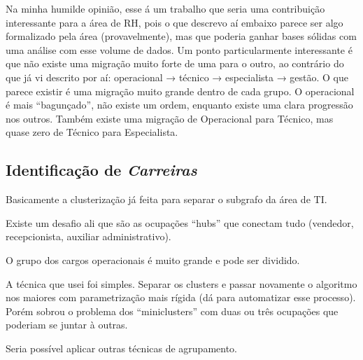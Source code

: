 \documentclass[12pt,a4paper]{article}
\theoremstyle{hypo}
\begin{document}
Na minha humilde opinião, esse á um trabalho que seria uma contribuição interessante para a área de RH, pois o que descrevo aí embaixo parece ser algo formalizado pela área (provavelmente), mas que poderia ganhar bases sólidas com uma análise com esse volume de dados. Um ponto particularmente interessante é que não existe uma migração muito forte de uma para o outro, ao contrário do que já vi descrito por aí: operacional → técnico → especialista → gestão. O que parece existir é uma migração muito grande dentro de cada grupo. O operacional é mais \enquote{bagunçado}, não existe um ordem, enquanto existe uma clara progressão nos outros. Também existe uma migração de Operacional para Técnico, mas quase zero de Técnico para Especialista.

\subsection{Identificação de \textit{Carreiras}}

Basicamente a clusterização já feita para separar o subgrafo da área de TI.

Existe um desafio ali que são as ocupações \enquote{hubs} que conectam tudo (vendedor, recepcionista, auxiliar administrativo).

O grupo dos cargos operacionais é muito grande e pode ser dividido.

A técnica que usei foi simples. Separar os clusters e passar novamente o algoritmo nos maiores com parametrização mais rígida (dá para automatizar esse processo). Porém sobrou o problema dos \enquote{miniclusters} com duas ou três ocupações que poderiam se juntar à outras.

Seria possível aplicar outras técnicas de agrupamento.

\def\refname{REFERÊNCIAS BIBLIOGRÁFICAS}


\end{document}
